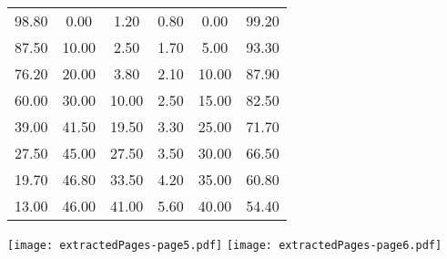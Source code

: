 \documentclass[\mainfilename]{subfiles}
\begin{document}
\begin{questionBox}
\begin{center}
\begin{tabular}{*{3}{C} | *{3}{C}}
            \\\midrule
            
               98.80 & 0.00 & 1.20 & 0.80 & 0.00 & 99.20
            \\ 87.50 & 10.00 & 2.50 & 1.70 & 5.00 & 93.30
            \\ 76.20 & 20.00 & 3.80 & 2.10 & 10.00 & 87.90
            \\ 60.00 & 30.00 & 10.00 & 2.50 & 15.00 & 82.50
            \\ 39.00 & 41.50 & 19.50 & 3.30 & 25.00 & 71.70
            \\ 27.50 & 45.00 & 27.50 & 3.50 & 30.00 & 66.50
            \\ 19.70 & 46.80 & 33.50 & 4.20 & 35.00 & 60.80
            \\ 13.00 & 46.00 & 41.00 & 5.60 & 40.00 & 54.40
            
            \\\bottomrule
        \end{tabular}
        \vspace{2ex}

        \texttt{[image: extractedPages-page5.pdf]}
        \texttt{[image: extractedPages-page6.pdf]}
    \end{center}
\end{questionBox}
\end{document}
